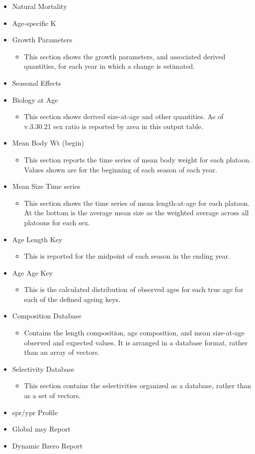 \begin{itemize}
\begin{itemize}
	\end{itemize}
	\item Natural Mortality
	\item Age-specific K
	\item Growth Parameters
	\begin{itemize}
		\item This section shows the growth parameters, and associated derived quantities, for each year in which a change is estimated.
	\end{itemize}
	\item Seasonal Effects
	\item Biology at Age
	\begin{itemize}
		\item This section shows derived size-at-age and other quantities. As of v.3.30.21 sex ratio is reported by area in this output table.
	\end{itemize}
	\item Mean Body Wt (begin)
	\begin{itemize}
		\item This section reports the time series of mean body weight for each platoon. Values shown are for the beginning of each season of each year.
	\end{itemize}
	\item Mean Size Time series
	\begin{itemize}
		\item This section shows the time series of mean length-at-age for each platoon. At the bottom is the average mean size as the weighted average across all platoons for each sex.
	\end{itemize}
	\item Age Length Key
	\begin{itemize}
		\item This is reported for the midpoint of each season in the ending year.
	\end{itemize}
	\item Age Age Key
	\begin{itemize}
		\item This is the calculated distribution of observed ages for each true age for each of the defined ageing keys.
	\end{itemize}
	\item Composition Database
	\begin{itemize}
		\item Contains the length composition, age composition, and mean size-at-age observed and expected values. It is arranged in a database format, rather than an array of vectors.
	\end{itemize}
	\item Selectivity Database
	\begin{itemize}
		\item This section contains the selectivities organized as a database, rather than as a set of vectors.
	\end{itemize}
	\item \gls{spr}/\gls{ypr} Profile
	\item Global \gls{msy} Report
	\item Dynamic Bzero Report
\end{itemize}

\pagebreak
